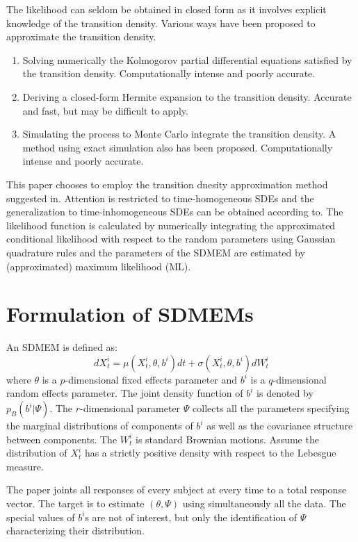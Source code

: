 \documentclass[12pt]{extarticle}
\begin{document}
The likelihood can seldom be obtained in closed form as it involves explicit knowledge of the transition density. Various ways have been proposed to approximate the transition density.
\begin{enumerate}
  \item Solving numerically the Kolmogorov partial differential equations satisfied by the transition density\cite{Lo88}. Computationally intense and poorly accurate\cite{Sahalia02}.
  \item Deriving a closed-form Hermite expansion to the transition density\cite{Sahalia08}. Accurate and fast, but may be difficult to apply\cite{Durham02}.
  \item Simulating the process to Monte Carlo integrate the transition density\cite{Durham02}. A method using exact simulation also has been proposed\cite{Beskos06}. Computationally intense and poorly accurate\cite{Sahalia02}.
\end{enumerate}
This paper chooses to employ the transition dnesity approximation method suggested in\cite{Sahalia08}. Attention is restricted to time-homogeneous SDEs and the generalization to time-inhomogeneous SDEs can be obtained according to\cite{Egorov03}. The likelihood function is calculated by numerically integrating the approximated conditional likelihood with respect to the random parameters using Gaussian quadrature rules and the parameters of the SDMEM are estimated by (approximated) maximum likelihood (ML).
\section{Formulation of SDMEMs}
An SDMEM is defined as:
\begin{equation}
dX_{t}^{i}=\mu{}(X_{t}^{i},\theta,b^{i})dt+\sigma{}(X_{t}^{i},\theta,b^{i})dW_{t}^{i}
\end{equation}
where $\theta$ is a $p$-dimensional fixed effects parameter and $b^i$ is a $q$-dimensional random effects parameter. The joint density function of $b^i$ is denoted by $p_{B}(b^{i}|\Psi{})$. The $r$-dimensional parameter $\Psi$ collects all the parameters specifying the marginal distributions of components of $b^i$ as well as the covariance structure between components. The $W_{t}^{i}$ is standard Brownian motions. Assume the distribution of $X_{t}^{i}$ has a strictly positive density with respect to the Lebesgue measure. 

The paper joints all responses of every subject at every time to a total response vector. The target is to estimate $(\theta{},\Psi)$ using simultaneously all the data. The special values of $b^i$s are not of interest, but only the identification of $\Psi$ characterizing their distribution.
\end{document}
